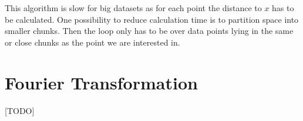 This algorithm is slow for big datasets as for each point the distance to $x$ has to be calculated. One possibility to reduce calculation time is to partition space into smaller chunks. Then the loop only has to be over data points lying in the same or close chunks as the point we are interested in.

\section{Fourier Transformation}
\label{subsec:fourier_transformation}

[TODO]
